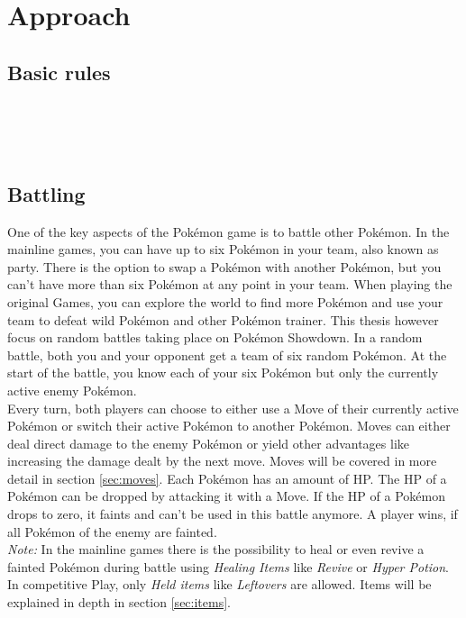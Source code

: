 
\chapter{Approach}
\label{ch:approach}

\section{Basic rules}
 \\
 \\
 \\

\section{Battling}
\label{sec:battling}
One of the key aspects of the Pokémon game is to battle other Pokémon. In the mainline games, you can 
have up to six Pokémon in your team, also known as party. There is the option to swap a Pokémon with
another Pokémon, but you can't have more than six Pokémon at any point in your team. When playing the 
original Games, you can explore the world to find more Pokémon and use your team to defeat wild Pokémon
and other Pokémon trainer. This thesis however focus on random battles taking place on Pokémon Showdown.
In a random battle, both you and your opponent get a team of six random Pokémon. At the start of the battle,
you know each of your six Pokémon but only the currently active enemy Pokémon. \\
Every turn, both players can choose to either use a Move of their currently active Pokémon or switch
their active Pokémon to another Pokémon. Moves can either deal direct damage to the enemy Pokémon or 
yield other advantages like increasing the damage dealt by the next move. Moves will be covered in more
detail in section \ref{sec:moves}. Each Pokémon has an amount of \ac{HP}. The \ac{HP} of a Pokémon
can be dropped by attacking it with a Move. If the \ac{HP} of a Pokémon drops to zero, it faints and 
can't be used in this battle anymore. A player wins, if all Pokémon of the enemy are fainted. \\
\textit{Note:} In the mainline games there is the possibility to heal or even revive a fainted 
Pokémon during battle using \textit{Healing Items} like \textit{Revive} or \textit{Hyper Potion}.
In competitive Play, only \textit{Held items} like \textit{Leftovers} are allowed. Items will be explained
in depth in section \ref{sec:items}.

